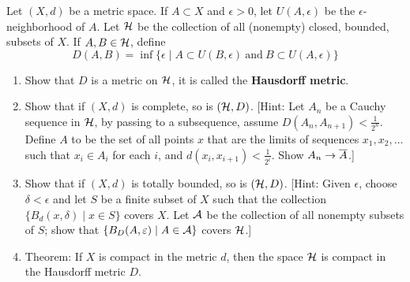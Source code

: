 \documentclass[a4paper, 10pt]{article}
\begin{document}
\begin{problem} [45.7 \done]
    Let $(X, d)$ be a metric space. If $A \subset X$ and $\epsilon > 0$, let $U(A, \epsilon)$ be the $\epsilon$-neighborhood of $A$. Let $\mathcal{H}$ be the collection of all (nonempty) closed, bounded, subsets of $X$. If $A, B \in \mathcal{H}$, define \begin{equation*}
    D(A, B) = \inf \{\epsilon \mid A \subset U(B, \epsilon) \:\text{and}\: B \subset U(A, \epsilon)\}
    \end{equation*}
    \begin{enumerate}
    \item Show that $D$ is a metric on $\mathcal{H}$, it is called the \textbf{Hausdorff metric}.
    \item Show that if $(X, d)$ is complete, so is $(\mathcal{H}, D)$. [Hint: Let $A_n$ be a Cauchy sequence in $\mathcal{H}$, by passing to a subsequence, assume $D(A_n, A_{n+1}) < \frac{1}{2^n}$. Define $A$ to be the set of all points $x$ that are the limits of sequences $x_1, x_2, \ldots$ such that $x_i \in A_i$ for each $i$, and $d(x_i, x_{i+1}) < \frac{1}{2^i}$. Show $A_n \to \overline{A}$.]   
    \item Show that if $(X, d)$ is totally bounded, so is $(\mathcal{H}, D)$. [Hint: Given $\epsilon$, choose $\delta < \epsilon$ and let $S$ be a finite subset of $X$ such that the collection $\{B_d(x, \delta) \mid x \in S\}$ covers $X$. Let $\mathcal{A}$ be the collection of all nonempty subsets of $S$; show that $\{B_D(A, \varepsilon) \mid A \in \mathcal{A}\}$ covers $\mathcal{H}$.]
    \item Theorem: If $X$ is compact in the metric $d$, then the space $\mathcal{H}$ is compact in the Hausdorff metric $D$.
    \end{enumerate}
\end{problem}
\end{document}
